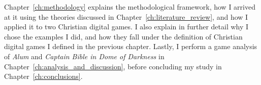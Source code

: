 Chapter~\ref{ch:methodology} explains the methodological framework, how I arrived at it using the theories discussed in Chapter~\ref{ch:literature_review}, and how I applied it to two Christian digital games. I also explain in further detail why I chose the examples I did, and how they fall under the definition of Christian digital games I defined in the previous chapter. Lastly, I perform a game analysis of \textit{Alum} \parencite{orsie_alum_2006} and \textit{Captain Bible in Dome of Darkness} \parencite{engelbrite_captain_1994} in Chapter~\ref{ch:analysis_and_discussion}, before concluding my study in Chapter~\ref{ch:conclusions}.
